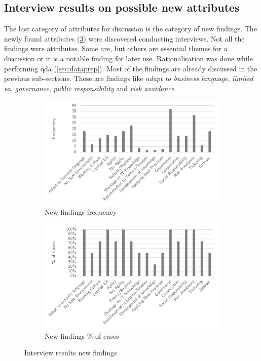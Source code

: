 \subsection{Interview results on possible new attributes}
\label{sub:interviewresultsnewattributes}
The last category of \glspl{attribute} for discussion is the category of new findings. The newly found \glspl{attribute} \mbox{(\cref{fig:interviewresultsfindings})} were discovered conducting interviews. Not all the findings were \glspl{attribute}. Some are, but others are essential themes for a discussion or it is a notable finding for later use. Rationalisation was done while performing \acrshort{qda} (\cref{sec:dataprep}). Most of the findings are already discussed in the previous sub-sections. These are findings like \textit{adapt to business language}, \textit{limited \acrshort{ea}}, \textit{governance}, \textit{public responsibility} and \textit{risk avoidance}. 
\begin{figure}[H]
	\centering
	\begin{subfigure}[H]{0.5\textwidth}
		\centering
		\includegraphics[width=0.95\linewidth]{images/findings_frequency}
		\caption{New findings frequency}
		\label{fig:findingsfrequency}
	\end{subfigure}%
	\begin{subfigure}[H]{0.5\textwidth}
		\centering
		\includegraphics[width=0.95\linewidth]{images/findings_cases}
		\caption{New findings \% of cases}
		\label{fig:findingscases}
	\end{subfigure}
	\caption{Interview results new findings}
	\label{fig:interviewresultsfindings}
\end{figure}
